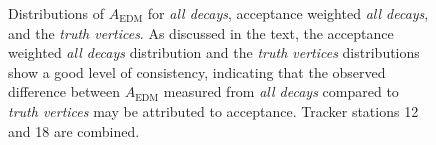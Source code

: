 \begin{figure}[t!]
\centering{}
\hfill
{}
\caption{Distributions of $A_{\text{EDM}}$ for \textit{all decays}, acceptance weighted \textit{all decays}, and the \textit{truth vertices}. As discussed in the text, the acceptance weighted \textit{all decays} distribution and the \textit{truth vertices} distributions show a good level of consistency, indicating that the observed difference between $A_{\text{EDM}}$ measured from \textit{all decays} compared to \textit{truth vertices} may be attributed to acceptance. Tracker stations 12 and 18 are combined.} 
\label{fig:AcceptanceCorrected_AEDM_vs_p_overlay}
\end{figure} 

